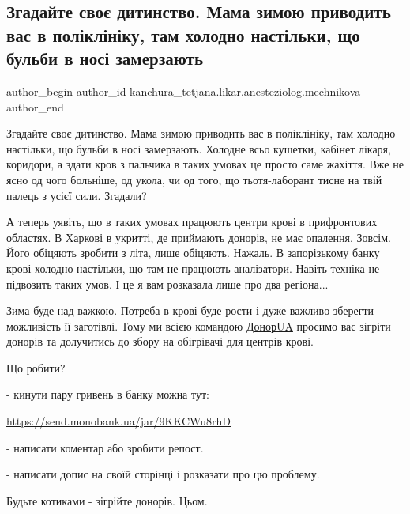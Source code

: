 
 
 
 
 

\subsection{Згадайте своє дитинство. Мама зимою приводить вас в поліклініку, там холодно настільки, що бульби в носі замерзають}
\label{sec:19_11_2022.fb.kanchura_tetjana.likar.anesteziolog.mechnikova.1.zgadaite_svo__ditins}

\ifcmt
 author_begin
   author_id kanchura_tetjana.likar.anesteziolog.mechnikova
 author_end
\fi

Згадайте своє дитинство. Мама зимою приводить вас в поліклініку, там холодно
настільки, що бульби в носі замерзають. Холодне всьо кушетки, кабінет лікаря,
коридори, а здати кров з пальчика в таких умовах це просто саме жахіття. Вже не
ясно од чого больніше, од укола, чи од того, що тьотя-лаборант тисне на твій
палець з усієї сили. Згадали?

А теперь уявіть, що в таких умовах працюють центри крові в прифронтових
областях. В Харкові в укритті, де приймають донорів, не має опалення. Зовсім.
Його обіцяють зробити з літа, лише обіцяють. Нажаль. В запорізькому банку крові
холодно настільки, що там не працюють аналізатори. Навіть техніка не підвозить
таких умов. І це я вам розказала лише про два регіона...

Зима буде над важкою. Потреба в крові буде рости і дуже важливо зберегти
можливість її заготівлі. Тому ми всією командою \href{https://www.facebook.com/DonorUA.Ukraine}{ДонорUA} просимо вас зігріти
донорів та долучитись до збору на обігрівачі для центрів крові. 

Що робити?

- кинути пару гривень в банку можна тут:

\url{https://send.monobank.ua/jar/9KKCWu8rhD}

- написати коментар або зробити репост.

- написати допис на своїй сторінці і розказати про цю проблему. 

Будьте котиками - зігрійте донорів. Цьом.
